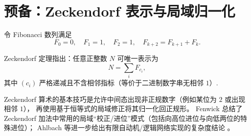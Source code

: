 \section{预备：Zeckendorf 表示与局域归一化}

令 Fibonacci 数列满足
$$
F_0=0,\quad F_1=1,\quad F_2=1,\quad F_{k+2}=F_{k+1}+F_k.
$$

Zeckendorf 定理指出：任意正整数 $N$ 可唯一表示为
$$
N=\sum_i F_{c_i},
$$
其中 $(c_i)$ 严格递减且不含相邻指标（等价于二进制数字串无相邻 $1$）\cite{WikipediaZeckendorf}.

Zeckendorf 算术的基本技巧是允许中间态出现非正规数字（例如某位为 $2$ 或出现相邻 $1$），
再使用基于恒等式的局域修正将其归一化回正规形。
Fenwick 总结了 Zeckendorf 加法中常用的局域“校正/进位”模式（包括向高位进位与向低两位的特殊进位）\cite{Fenwick2003ZeckendorfArithmetic}；
Ahlbach 等进一步给出有限自动机/逻辑网络实现的复杂度结论 \cite{AhlbachEtAl2013ZeckendorfArithmetic}。

